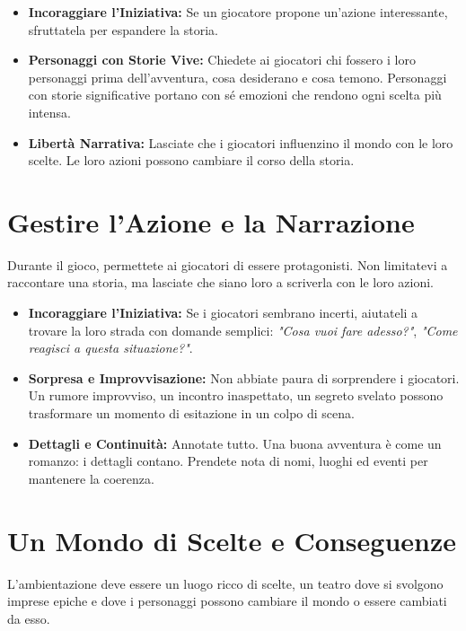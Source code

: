 \documentclass[../manuale_main.tex]{subfiles}
\begin{document}
\begin{itemize}
    \item \textbf{Incoraggiare l'Iniziativa:} Se un giocatore propone un'azione interessante, sfruttatela per espandere la storia.
    
    \item \textbf{Personaggi con Storie Vive:} Chiedete ai giocatori chi fossero i loro personaggi prima dell’avventura, cosa desiderano e cosa temono. Personaggi con storie significative portano con sé emozioni che rendono ogni scelta più intensa.
    
    \item \textbf{Libertà Narrativa:} Lasciate che i giocatori influenzino il mondo con le loro scelte. Le loro azioni possono cambiare il corso della storia.
\end{itemize}

\vspace{0.3cm}

\section{Gestire l'Azione e la Narrazione}
Durante il gioco, permettete ai giocatori di essere protagonisti. Non limitatevi a raccontare una storia, ma lasciate che siano loro a scriverla con le loro azioni.

\begin{itemize}
    \item \textbf{Incoraggiare l'Iniziativa:} Se i giocatori sembrano incerti, aiutateli a trovare la loro strada con domande semplici: \textit{"Cosa vuoi fare adesso?"}, \textit{"Come reagisci a questa situazione?"}.
    
    \item \textbf{Sorpresa e Improvvisazione:} Non abbiate paura di sorprendere i giocatori. Un rumore improvviso, un incontro inaspettato, un segreto svelato possono trasformare un momento di esitazione in un colpo di scena.
    
    \item \textbf{Dettagli e Continuità:} Annotate tutto. Una buona avventura è come un romanzo: i dettagli contano. Prendete nota di nomi, luoghi ed eventi per mantenere la coerenza.
\end{itemize}

\vspace{0.3cm}

\section{Un Mondo di Scelte e Conseguenze}
L'ambientazione deve essere un luogo ricco di scelte, un teatro dove si svolgono imprese epiche e dove i personaggi possono cambiare il mondo o essere cambiati da esso.
\end{document}
